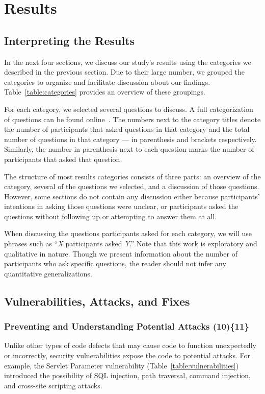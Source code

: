 \documentclass{sig-alternate}
\begin{document}
\section{Results}
\vspace{-2mm}
\subsection{Interpreting the Results}
\label{sec:results}

In the next four sections, we discuss our study's results using the categories we described in the previous section.
Due to their large number, we grouped the categories to organize and facilitate discussion about our findings. 
Table~\ref{table:categories} provides an overview of these groupings.

For each category, we selected several questions to discuss. A full categorization of questions can be found online~\cite{ExperimentalMaterials}.
The numbers next to the category titles denote the number of participants that asked questions in that category and the total number of questions in that category --- in parenthesis and brackets respectively. Similarly, the number in parenthesis next to each question marks the number of participants that asked that question.

The structure of most results categories consists of three parts: an overview of the category, several of the questions we selected, and a discussion of those questions.
However, some sections do not contain any discussion either because participants' intentions in asking those questions were unclear, or participants asked the questions without following up or attempting to answer them at all. 

When discussing the questions participants asked for each category, we will use phrases such as ``\emph{X} participants asked \emph{Y}.''
Note that this work is exploratory and qualitative in nature.
Though we present information about the number of participants who ask specific questions, the reader should not infer any quantitative generalizations.

\subsection{Vulnerabilities, Attacks, and Fixes}
\label{sec:results-vaf}
\vspace{-3mm}
\subsubsection{\textbf{Preventing and Understanding Potential Attacks (10)\{11\}}}\label{pupa}
Unlike other types of code defects that may cause code to function unexpectedly or incorrectly, security vulnerabilities expose the code to potential attacks. For example, the Servlet Parameter vulnerability (Table~\ref{table:vulnerabilities}) introduced the possibility of SQL injection, path traversal, command injection, and cross-site scripting attacks.
\\
\end{document}
